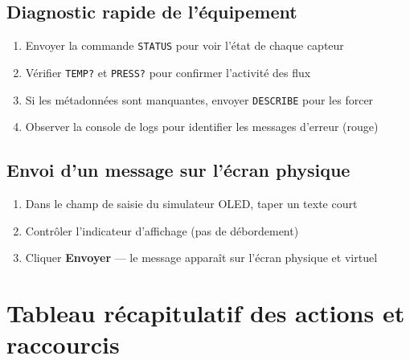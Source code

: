 \documentclass[a4paper,12pt]{article}
\newcommand{\cmd}[1]{\texttt{\colorbox{CodeBg}{\textcolor{PrimaryBlue}{#1}}}}
\begin{document}
\subsection{Diagnostic rapide de l'\'equipement}

\begin{enumerate}[noitemsep, label=\arabic*.]
  \item Envoyer la commande \cmd{STATUS} pour voir l'\'etat de chaque capteur
  \item V\'erifier \cmd{TEMP?} et \cmd{PRESS?} pour confirmer l'activit\'e des flux
  \item Si les m\'etadonn\'ees sont manquantes, envoyer \cmd{DESCRIBE} pour les forcer
  \item Observer la console de logs pour identifier les messages d'erreur (rouge)
\end{enumerate}

\subsection{Envoi d'un message sur l'\'ecran physique}

\begin{enumerate}[noitemsep, label=\arabic*.]
  \item Dans le champ de saisie du simulateur OLED, taper un texte court
  \item Contr\^oler l'indicateur d'affichage (pas de d\'ebordement)
  \item Cliquer \textbf{Envoyer} --- le message appara\^it sur l'\'ecran physique et virtuel
\end{enumerate}

\section{Tableau r\'ecapitulatif des actions et raccourcis}
\end{document}
